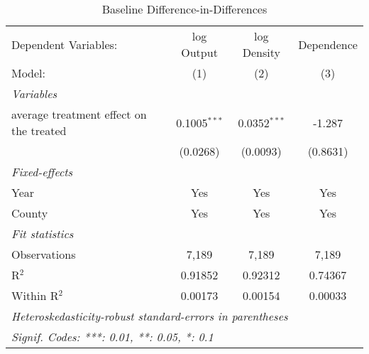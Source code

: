 
\begin{table}[htbp]
   \caption{Baseline Difference-in-Differences}
   \centering
   \begin{adjustbox}{max width = \textwidth, center}
      \begin{tabular}{lccc}
         \tabularnewline \midrule \midrule
         Dependent Variables:                    & log Output     & log Density    & Dependence\\  
         Model:                                  & (1)            & (2)            & (3)\\  
         \midrule
         \emph{Variables}\\
         average treatment effect on the treated & 0.1005$^{***}$ & 0.0352$^{***}$ & -1.287\\   
                                                 & (0.0268)       & (0.0093)       & (0.8631)\\   
         \midrule
         \emph{Fixed-effects}\\
         Year                                    & Yes            & Yes            & Yes\\  
         County                                  & Yes            & Yes            & Yes\\  
         \midrule
         \emph{Fit statistics}\\
         Observations                            & 7,189          & 7,189          & 7,189\\  
         R$^2$                                   & 0.91852        & 0.92312        & 0.74367\\  
         Within R$^2$                            & 0.00173        & 0.00154        & 0.00033\\  
         \midrule \midrule
         \multicolumn{4}{l}{\emph{Heteroskedasticity-robust standard-errors in parentheses}}\\
         \multicolumn{4}{l}{\emph{Signif. Codes: ***: 0.01, **: 0.05, *: 0.1}}\\
      \end{tabular}
   \end{adjustbox}
\end{table}


